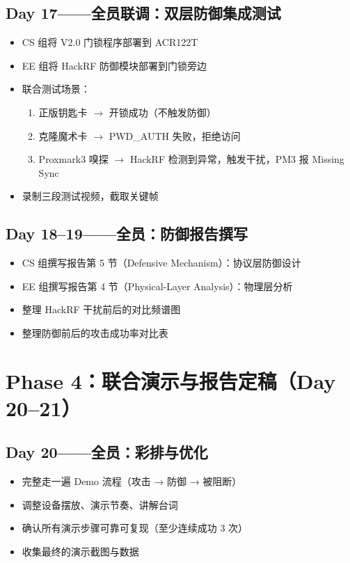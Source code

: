 \documentclass[12pt,a4paper]{ctexart}
\begin{document}
\subsection*{Day 17——全员联调：双层防御集成测试}
\begin{itemize}[nosep]
    \item CS 组将 V2.0 门锁程序部署到 ACR122T
    \item EE 组将 HackRF 防御模块部署到门锁旁边
    \item 联合测试场景：
    \begin{enumerate}[nosep,label=场景\arabic*:]
        \item 正版钥匙卡 $\to$ 开锁成功（不触发防御）
        \item 克隆魔术卡 $\to$ PWD\_AUTH 失败，拒绝访问
        \item Proxmark3 嗅探 $\to$ HackRF 检测到异常，触发干扰，PM3 报 Missing Sync
    \end{enumerate}
    \item 录制三段测试视频，截取关键帧
\end{itemize}

\subsection*{Day 18--19——全员：防御报告撰写}
\begin{itemize}[nosep]
    \item CS 组撰写报告第 5 节（Defensive Mechanism）：协议层防御设计
    \item EE 组撰写报告第 4 节（Physical-Layer Analysis）：物理层分析
    \item 整理 HackRF 干扰前后的对比频谱图
    \item 整理防御前后的攻击成功率对比表
\end{itemize}

\section{Phase 4：联合演示与报告定稿（Day 20--21）}

\subsection*{Day 20——全员：彩排与优化}
\begin{itemize}[nosep]
    \item 完整走一遍 Demo 流程（攻击 → 防御 → 被阻断）
    \item 调整设备摆放、演示节奏、讲解台词
    \item 确认所有演示步骤可靠可复现（至少连续成功 3 次）
    \item 收集最终的演示截图与数据
\end{itemize}
\end{document}
